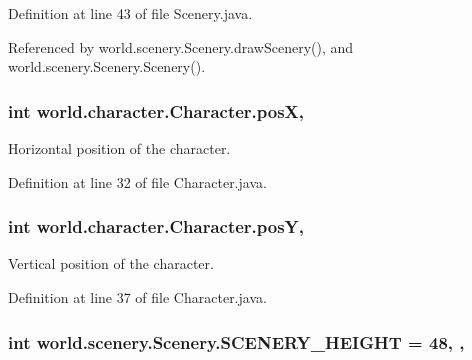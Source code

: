 Definition at line 43 of file Scenery.\-java.



Referenced by world.\-scenery.\-Scenery.\-draw\-Scenery(), and world.\-scenery.\-Scenery.\-Scenery().

\hypertarget{classworld_1_1character_1_1_character_a78ad3a5c111a39df2ba12b542fa175b4}{
\subsubsection[{pos\-X}]{\setlength{\rightskip}{0pt plus 5cm}int world.\-character.\-Character.\-pos\-X\hspace{0.3cm}{\ttfamily [protected]}, {\ttfamily [inherited]}}}\label{classworld_1_1character_1_1_character_a78ad3a5c111a39df2ba12b542fa175b4}


Horizontal position of the character. 



Definition at line 32 of file Character.\-java.

\hypertarget{classworld_1_1character_1_1_character_a1e81a73a02b73e6f1608ba3c1b6d83ef}{
\subsubsection[{pos\-Y}]{\setlength{\rightskip}{0pt plus 5cm}int world.\-character.\-Character.\-pos\-Y\hspace{0.3cm}{\ttfamily [protected]}, {\ttfamily [inherited]}}}\label{classworld_1_1character_1_1_character_a1e81a73a02b73e6f1608ba3c1b6d83ef}


Vertical position of the character. 



Definition at line 37 of file Character.\-java.

\hypertarget{classworld_1_1scenery_1_1_scenery_a106e53ae6e1647395740237ccce7f363}{
\subsubsection[{S\-C\-E\-N\-E\-R\-Y\-\_\-\-H\-E\-I\-G\-H\-T}]{\setlength{\rightskip}{0pt plus 5cm}int world.\-scenery.\-Scenery.\-S\-C\-E\-N\-E\-R\-Y\-\_\-\-H\-E\-I\-G\-H\-T = 48\hspace{0.3cm}{\ttfamily [static]}, {\ttfamily [protected]}, {\ttfamily [inherited]}}}\label{classworld_1_1scenery_1_1_scenery_a106e53ae6e1647395740237ccce7f363}


